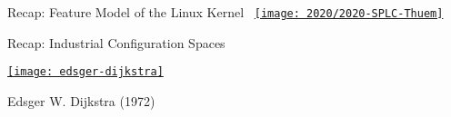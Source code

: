 \begin{frame}{Recap: Feature Model of the Linux Kernel}
	\vspace{28mm}~\hspace{-15mm}\href{https://dl.acm.org/doi/abs/10.1145/3382025.3414943}{\texttt{[image: 2020/2020-SPLC-Thuem]}}
\end{frame}

\begin{frame}{\myframetitle}
	\begin{mycolumns}[widths={60}]
		\begin{exampletight}{Recap: Industrial Configuration Spaces\mysource{\lectureintroduction}}
			\centering{}
		\end{exampletight}
	\mynextcolumn
		\href{https://commons.wikimedia.org/wiki/File:Edsger_Wybe_Dijkstra.jpg}{\texttt{[image: edsger-dijkstra]}}
		\vspace{-7mm}
		
		\begin{note}{Edsger W. Dijkstra (1972)}
			\mysource{\thehumbleprogrammer}
		\end{note}
	\end{mycolumns}
\end{frame}

\newcommand{\eemph}[1]{{\color{red}\textbf{#1}}}

